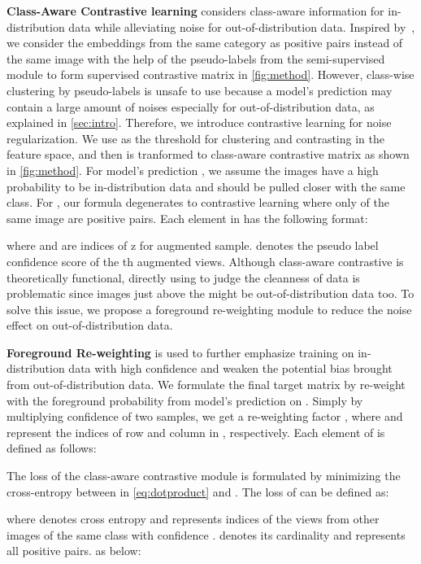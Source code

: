 \documentclass[10pt,twocolumn,letterpaper]{article}
\begin{document}
\textbf{Class-Aware Contrastive learning} considers class-aware information for in-distribution data while alleviating noise for out-of-distribution data. Inspired by~\cite{khosla2020supervised}, we consider the embeddings  from the same category as positive pairs instead of the same image with the help of the pseudo-labels  from the semi-supervised module to form supervised contrastive matrix  in \cref{fig:method}.  However, class-wise clustering by pseudo-labels is unsafe to use because a model's prediction may contain a large amount of noises especially for out-of-distribution data, as explained in \cref{sec:intro}. Therefore, we introduce contrastive learning for noise regularization. We use  as the threshold for clustering and contrasting in the feature space, and then  is tranformed to class-aware contrastive matrix  as shown in \cref{fig:method}.  For model's prediction , we assume the images have a high probability to be in-distribution data  and should be pulled closer with the same class. For , our formula degenerates to contrastive learning where only  of the same image are positive pairs. Each element  in  has the following format: 

where  and  are indices of z for augmented sample.  denotes the pseudo label confidence score of the th augmented views. Although class-aware contrastive is theoretically functional, directly using   to judge the cleanness of data is problematic since images just above the  might be out-of-distribution data too. To solve this issue, we propose a foreground re-weighting module to reduce the noise effect on out-of-distribution data. 

\textbf{Foreground Re-weighting} is used to further emphasize training on in-distribution data with high confidence and weaken the potential bias brought from out-of-distribution data. We formulate the final target matrix  by re-weight  with the foreground probability from model's prediction on . Simply by multiplying confidence  of two samples, we get a re-weighting factor , where  and   represent the indices of row and column in , respectively. Each element  of  is defined as follows:



The loss of the class-aware contrastive module  is formulated by minimizing the cross-entropy between  in \cref{eq:dotproduct} and . The loss of  can be defined as:


where  denotes cross entropy and  represents indices of the views from other images of the same class with confidence .  denotes its cardinality and  represents all positive pairs.  as below:
\end{document}

